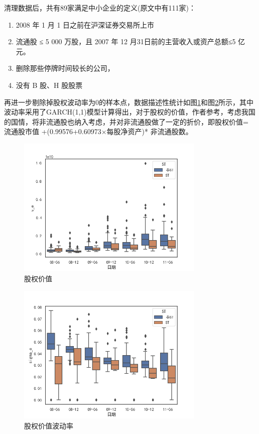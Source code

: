 \documentclass[a4paper,12pt]{ctexart}
\begin{document}
清理数据后，共有89家满足\citet{彭伟2012基于}中小企业的定义(原文中有111家)：
\begin{enumerate}
    \item 2008 年 1 月 1 日之前在沪深证券交易所上市
    \item 流通股 ≤ 5 000 万股，且 2007 年 12 月31日前的主营收入或资产总额≤5 亿元。
    \item 删除那些停牌时间较长的公司，
    \item 没有 B 股、H 股股票
\end{enumerate}

再进一步剔除掉股权波动率为0的样本点，数据描述性统计如图\ref{fig:des1}和图\ref{fig:des2}所示，其中波动率采用了GARCH(1,1)模型计算得出，对于股权的价值，作者参考\citet{张绍敏2007基于违约距离的财务预警模型}，考虑我国的国情，将非流通股也纳入考虑，并对非流通股做了一定的折价，即股权价值= 流通股市值 +(0.99576+0.60973$\times$每股净资产)* 非流通股数。
\begin{figure}[H]
    \centering
    \includegraphics[width=0.8\textwidth]{img/v_e.png}
    \caption{股权价值}\label{fig:des1}
\end{figure}
\begin{figure}[H]
    \centering
    \includegraphics[width=0.8\textwidth]{img/sigma_e.png}
    \caption{股权价值波动率}\label{fig:des2}
\end{figure}
\end{document}
